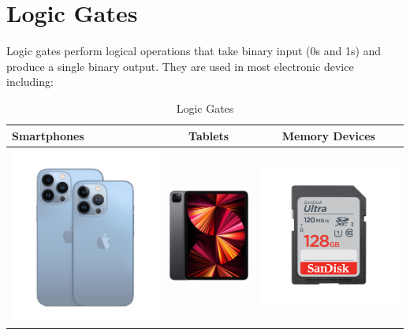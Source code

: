 \documentclass{article}
\begin{document}
\section{Logic Gates}
Logic gates perform logical operations that take binary input (0s and 1s) and produce a single binary output. They are used in most electronic device including:

\begin{table}[h!]
	\begin{center}
		\caption{Logic Gates}
		\label{tab:table1}
		\begin{tabular}{|l|c|c|}
			\hline
			Smartphones
			&
			Tablets
			&
			Memory Devices
			\\
		   \hline
		   \includegraphics[width=0.2\linewidth]{Picture2}
		   &
		   \includegraphics[width=0.2\linewidth]{Picture3}
		   &
		   \includegraphics[width=0.2\linewidth]{Picture4}
		   \\
		     \hline
	     \end{tabular}     	
	\end{center}
\end{table}
\end{document}
